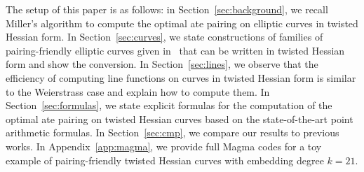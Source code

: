 The setup of this paper is as follows:
in Section~\ref{sec:background}, we recall Miller's algorithm to compute the optimal ate pairing on elliptic curves in twisted Hessian form.
In Section~\ref{sec:curves}, we state constructions of families of pairing-friendly elliptic curves given in~\cite{2010/freeman}
that can be written in twisted Hessian form and show the conversion.
In Section~\ref{sec:lines}, we observe that the efficiency of computing line functions on curves in twisted Hessian form is similar to the Weierstrass case
and explain how to compute them.
In Section~\ref{sec:formulas}, we state explicit formulas for the computation of the optimal ate pairing
on twisted Hessian curves based on the state-of-the-art point arithmetic formulas.
In Section~\ref{sec:cmp}, we compare our results to previous works.
In Appendix~\ref{app:magma}, we provide full Magma codes for a toy example of pairing-friendly twisted Hessian curves with embedding degree $k = 21$.


